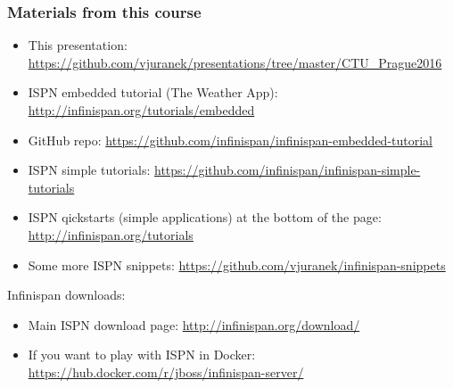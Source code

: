 \documentclass[10pt,utf8]{beamer}
\begin{document}
\begin{frame}
	\frametitle{Materials from this course}
	\scriptsize{
	\begin{itemize}
		\item This presentation: \color{blue}\url{https://github.com/vjuranek/presentations/tree/master/CTU_Prague2016}\color{black}
		\item ISPN embedded tutorial (The Weather App): \color{blue}\url{http://infinispan.org/tutorials/embedded}\color{black}
		\item GitHub repo: \color{blue}\url{https://github.com/infinispan/infinispan-embedded-tutorial}\color{black}
		\item ISPN simple tutorials: \color{blue}\url{https://github.com/infinispan/infinispan-simple-tutorials}\color{black}
		\item ISPN qickstarts (simple applications) at the bottom of the page: \color{blue}\url{http://infinispan.org/tutorials}\color{black}
		\item Some more ISPN snippets: \color{blue}\url{https://github.com/vjuranek/infinispan-snippets}\color{black}
	\end{itemize}
	}
	\vspace{0.5cm}
	Infinispan downloads:
	\scriptsize{
	\begin{itemize}
		\item Main ISPN download page: \color{blue}\url{http://infinispan.org/download/}\color{black}
		\item If you want to play with ISPN in Docker: \color{blue}\url{https://hub.docker.com/r/jboss/infinispan-server/}\color{black}
	\end{itemize}
	}
\end{frame}
\end{document}

